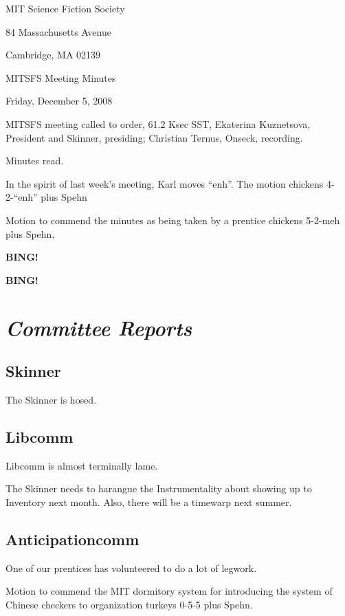 \documentclass[10pt]{article}
\newcommand{\bing}{{\bf BING!} }
\newcommand{\goto}[1]{\bing \vskip 12pt \section*{{\em{#1}}}}
\newcommand{\ps}{ plus Spehn\xspace}
\begin{document}
\begin{center}

MIT Science Fiction Society

84 Massachusetts Avenue

Cambridge, MA 02139

\vspace{12pt}

MITSFS Meeting Minutes

Friday, December 5, 2008

\end{center}

\vspace{18pt}

\setlength{\parskip}{6pt}

\noindent
MITSFS meeting called to order, 61.2 Ksec SST,
Ekaterina Kuznetsova, President and Skinner, presiding; Christian Ternus, Onseck, recording.

Minutes read.

In the spirit of last week's meeting, Karl moves ``enh''.  The motion chickens 4-2-``enh''\ps

Motion to commend the minutes as being taken by a prentice chickens 5-2-meh \ps.

\bing

\goto{Committee Reports}

\subsection*{Skinner}

The Skinner is hosed.

\subsection*{Libcomm}

Libcomm is almost terminally lame.

The Skinner needs to harangue the Instrumentality about showing up to
Inventory next month.  Also, there will be a timewarp next summer.

\subsection*{Anticipationcomm}

One of our prentices has volunteered to do a lot of legwork.

Motion to commend the MIT dormitory system for introducing the system
of Chinese checkers to organization turkeys 0-5-5\ps.
\end{document}
